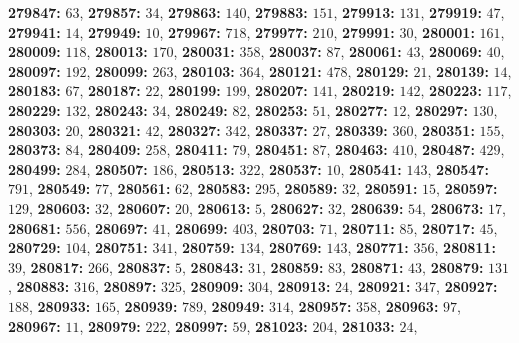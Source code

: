\textsf{\bfseries 279847:} $63$, \textsf{\bfseries 279857:} $34$, \textsf{\bfseries 279863:} $140$, \textsf{\bfseries 279883:} $151$, \textsf{\bfseries 279913:} $131$, \textsf{\bfseries 279919:} $47$, \textsf{\bfseries 279941:} $14$, \textsf{\bfseries 279949:} $10$, \textsf{\bfseries 279967:} $718$, \textsf{\bfseries 279977:} $210$, \textsf{\bfseries 279991:} $30$, \textsf{\bfseries 280001:} $161$, \textsf{\bfseries 280009:} $118$, \textsf{\bfseries 280013:} $170$, \textsf{\bfseries 280031:} $358$, \textsf{\bfseries 280037:} $87$, \textsf{\bfseries 280061:} $43$, \textsf{\bfseries 280069:} $40$, \textsf{\bfseries 280097:} $192$, \textsf{\bfseries 280099:} $263$, \textsf{\bfseries 280103:} $364$, \textsf{\bfseries 280121:} $478$, \textsf{\bfseries 280129:} $21$, \textsf{\bfseries 280139:} $14$, \textsf{\bfseries 280183:} $67$, \textsf{\bfseries 280187:} $22$, \textsf{\bfseries 280199:} $199$, \textsf{\bfseries 280207:} $141$, \textsf{\bfseries 280219:} $142$, \textsf{\bfseries 280223:} $117$, \textsf{\bfseries 280229:} $132$, \textsf{\bfseries 280243:} $34$, \textsf{\bfseries 280249:} $82$, \textsf{\bfseries 280253:} $51$, \textsf{\bfseries 280277:} $12$, \textsf{\bfseries 280297:} $130$, \textsf{\bfseries 280303:} $20$, \textsf{\bfseries 280321:} $42$, \textsf{\bfseries 280327:} $342$, \textsf{\bfseries 280337:} $27$, \textsf{\bfseries 280339:} $360$, \textsf{\bfseries 280351:} $155$, \textsf{\bfseries 280373:} $84$, \textsf{\bfseries 280409:} $258$, \textsf{\bfseries 280411:} $79$, \textsf{\bfseries 280451:} $87$, \textsf{\bfseries 280463:} $410$, \textsf{\bfseries 280487:} $429$, \textsf{\bfseries 280499:} $284$, \textsf{\bfseries 280507:} $186$, \textsf{\bfseries 280513:} $322$, \textsf{\bfseries 280537:} $10$, \textsf{\bfseries 280541:} $143$, \textsf{\bfseries 280547:} $791$, \textsf{\bfseries 280549:} $77$, \textsf{\bfseries 280561:} $62$, \textsf{\bfseries 280583:} $295$, \textsf{\bfseries 280589:} $32$, \textsf{\bfseries 280591:} $15$, \textsf{\bfseries 280597:} $129$, \textsf{\bfseries 280603:} $32$, \textsf{\bfseries 280607:} $20$, \textsf{\bfseries 280613:} $5$, \textsf{\bfseries 280627:} $32$, \textsf{\bfseries 280639:} $54$, \textsf{\bfseries 280673:} $17$, \textsf{\bfseries 280681:} $556$, \textsf{\bfseries 280697:} $41$, \textsf{\bfseries 280699:} $403$, \textsf{\bfseries 280703:} $71$, \textsf{\bfseries 280711:} $85$, \textsf{\bfseries 280717:} $45$, \textsf{\bfseries 280729:} $104$, \textsf{\bfseries 280751:} $341$, \textsf{\bfseries 280759:} $134$, \textsf{\bfseries 280769:} $143$, \textsf{\bfseries 280771:} $356$, \textsf{\bfseries 280811:} $39$, \textsf{\bfseries 280817:} $266$, \textsf{\bfseries 280837:} $5$, \textsf{\bfseries 280843:} $31$, \textsf{\bfseries 280859:} $83$, \textsf{\bfseries 280871:} $43$, \textsf{\bfseries 280879:} $131$, \textsf{\bfseries 280883:} $316$, \textsf{\bfseries 280897:} $325$, \textsf{\bfseries 280909:} $304$, \textsf{\bfseries 280913:} $24$, \textsf{\bfseries 280921:} $347$, \textsf{\bfseries 280927:} $188$, \textsf{\bfseries 280933:} $165$, \textsf{\bfseries 280939:} $789$, \textsf{\bfseries 280949:} $314$, \textsf{\bfseries 280957:} $358$, \textsf{\bfseries 280963:} $97$, \textsf{\bfseries 280967:} $11$, \textsf{\bfseries 280979:} $222$, \textsf{\bfseries 280997:} $59$, \textsf{\bfseries 281023:} $204$, \textsf{\bfseries 281033:} $24$, 
